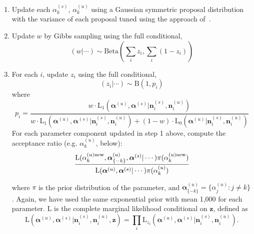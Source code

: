 \documentclass{article}
\begin{document}
\begin{enumerate}
\item  Update each $\alpha^{(s)}_{k}$, $\alpha^{(u)}_{k}$ using a Gaussian symmetric proposal distribution with the variance of each proposal tuned using the approach of~\cite{Gelman:2004tc}.
\item Update $w$ by Gibbs sampling using the full conditional,
\[
(w|\cdots)\sim\mathrm{Beta}(\sum_i z_i,\sum_i(1-z_i))
\]
\item For each $i$, update $z_i$ using the full conditional,
\[
(z_i|\cdots)\sim \mathrm{B}(1,p_i)
\]
where
\[
p_i = \frac{w\cdot\mathrm{L_1}(\boldsymbol{\alpha}^{(u)},\boldsymbol{\alpha}^{(s)}|\mathbf{n}^{(s)}_{i},\mathbf{n}^{(u)}_{i})}{w\cdot\mathrm{L_1}(\boldsymbol{\alpha}^{(u)},\boldsymbol{\alpha}^{(s)}|\mathbf{n}^{(s)}_{i},\mathbf{n}^{(u)}_{i})+(1-w)\cdot\mathrm{L_0}(\boldsymbol{\alpha}^{(u)}|\mathbf{n}^{(s)}_{i},\mathbf{n}^{(u)}_{i})}
\]
For each parameter component updated in step 1 above, compute the acceptance ratio (e.g. $\alpha^{(u)}_{k}$, below):
\[
\frac{\mathrm{L}(\alpha^{(u)\text{new}}_{k},\boldsymbol{\alpha}^{(u)}_{\{-k\}},\boldsymbol{\alpha}^{(s)}|\cdots)\pi(\alpha^{(u)\text{new}}_{k})}{\mathrm{L}(\boldsymbol{\alpha}^{(u)},\boldsymbol{\alpha}^{(s)}|\cdots)\pi(\alpha^{(u)}_{k})}\\
\]

where $\pi$ is the prior distribution of the parameter, and $\boldsymbol{\alpha}^{(u)}_{\{-k\}} = \{\alpha^{(u)}_{j} :  j\neq k\}$. Again, we have used the same exponential prior with mean 1,000 for each parameter. $\mathrm{L}$ is the complete marginal likelihood conditional on $\mathbf{z}$, defined as
\[
\mathrm{L}(\boldsymbol{\alpha}^{(u)},\boldsymbol{\alpha}^{(s)}|\mathbf{n}^{(s)}_{i},\mathbf{n}^{(u)}_{i},\mathbf{z}) = \prod_i \mathrm{L}_{z_i}(\boldsymbol{\alpha}^{(u)},\boldsymbol{\alpha}^{(s)}|\mathbf{n}^{(s)}_{i},\mathbf{n}^{(u)}_{i}).
\]

\end{enumerate}
\end{document}
